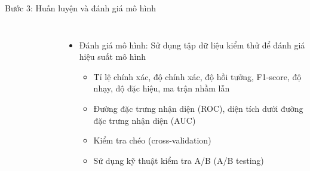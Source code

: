 \documentclass{beamer}
\begin{document}
\begin{frame}{Bước 3: Huấn luyện và đánh giá mô hình}
    \begin{columns}
        \begin{figure}
            \centering
        \end{figure}
        \begin{itemize}
            \item Đánh giá mô hình: Sử dụng tập dữ liệu kiểm thử để đánh giá hiệu suất mô hình
            \begin{itemize}
                \item Tỉ lệ chính xác, độ chính xác, độ hồi tưởng, F1-score, độ nhạy, độ đặc hiệu, ma trận nhầm lẫn
                \item Đường đặc trưng nhận diện (ROC), diện tích dưới đường đặc trưng nhận diện (AUC)
                \item Kiểm tra chéo (cross-validation)
                \item Sử dụng kỹ thuật kiểm tra A/B (A/B testing)
            \end{itemize}
        \end{itemize}
    \end{columns}
\end{frame}
\end{document}
